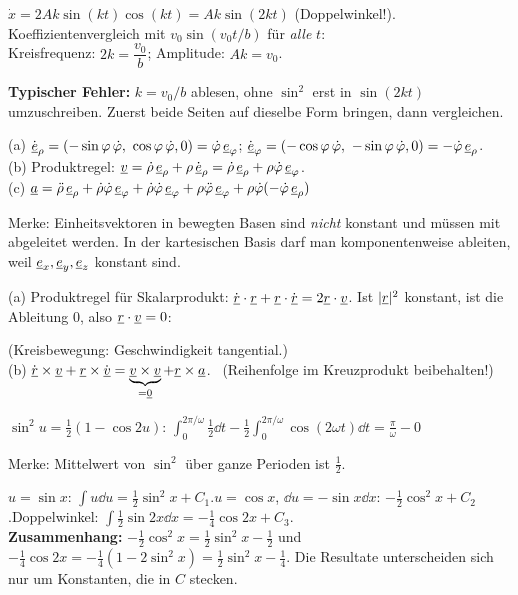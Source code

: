 \documentclass[11pt]{article}
\newcommand{\res}[1]{\par\smallskip\fbox{\ensuremath{\displaystyle #1}}\par\smallskip}
\begin{document}
 $\dot x=2Ak\sin(kt)\cos(kt)=Ak\sin(2kt)$ (Doppelwinkel!).\\
Koeffizientenvergleich mit $v_0\sin(v_0t/b)$ für \emph{alle} $t$:\\
Kreisfrequenz: $2k=\dfrac{v_0}{b}$; \quad Amplitude: $Ak=v_0$.
\res{k=\frac{v_0}{2b},\qquad A=2b}
\textbf{Typischer Fehler:} $k=v_0/b$ ablesen, ohne $\sin^2$ erst in $\sin(2kt)$ umzuschreiben. Zuerst beide Seiten auf dieselbe Form bringen, dann vergleichen.

 (a) $\dot{\vv e}_\rho=(-\sin\varphi\,\dot\varphi,\ \cos\varphi\,\dot\varphi,0)=\dot\varphi\,\e\varphi$;\quad
$\dot{\vv e}_\varphi=(-\cos\varphi\,\dot\varphi,\ -\sin\varphi\,\dot\varphi,0)=-\dot\varphi\,\e\rho$.\\
(b) Produktregel: $\underline{v}=\dot\rho\,\underline{e}_{\rho}+\rho\,\dot{\underline{e}}_\rho=\dot\rho\,\underline{e}_{\rho}+\rho\dot\varphi\,\underline{e}_{\varphi}$. \checkmark\\
(c) $\underline{a}=\ddot\rho\,\underline{e}_{\rho}+\dot\rho\dot\varphi\,\underline{e}_{\varphi}+\dot\rho\dot\varphi\,\underline{e}_{\varphi}+\rho\ddot\varphi\,\underline{e}_{\varphi}+\rho\dot\varphi(-\dot\varphi\,\underline{e}_{\rho})$
\res{\vv a=(\ddot\rho-\rho\dot\varphi^2)\,\e\rho+(2\dot\rho\dot\varphi+\rho\ddot\varphi)\,\e\varphi}
Merke: Einheitsvektoren in bewegten Basen sind \emph{nicht} konstant und müssen mit abgeleitet werden. In der kartesischen Basis darf man komponentenweise ableiten, weil $\underline{e}_{x},\underline{e}_{y},\underline{e}_{z}$ konstant sind.

 (a) Produktregel für Skalarprodukt: $\dot{\underline{r}}\cdot\underline{r}+\underline{r}\cdot\dot{\underline{r}}=2\underline{r}\cdot\underline{v}$. Ist $|\underline{r}|^2$ konstant, ist die Ableitung $0$, also $\underline{r}\cdot\underline{v}=0$: \res{\vv v\perp\vv r} (Kreisbewegung: Geschwindigkeit tangential.)\\
(b) $\dot{\underline{r}}\times\underline{v}+\underline{r}\times\dot{\underline{v}}=\underbrace{\underline{v}\times\underline{v}}_{=\underline{0}}+\underline{r}\times\underline{a}$. \checkmark\ (Reihenfolge im Kreuzprodukt beibehalten!)

 $\sin^2u=\frac12(1-\cos2u)$:
$\displaystyle\int_0^{2\pi/\omega}\tfrac12\dd t-\tfrac12\int_0^{2\pi/\omega}\cos(2\omega t)\dd t=\frac{\pi}{\omega}-0$ \res{\frac{\pi}{\omega}}
Merke: Mittelwert von $\sin^2$ über ganze Perioden ist $\tfrac12$.

 $u=\sin x$: $\int u\dd u=\tfrac12\sin^2x+C_1$.\quad $u=\cos x$, $\dd u=-\sin x\dd x$: $-\tfrac12\cos^2x+C_2$.\quad Doppelwinkel: $\int\tfrac12\sin2x\dd x=-\tfrac14\cos2x+C_3$.\\
\textbf{Zusammenhang:} $-\tfrac12\cos^2x=\tfrac12\sin^2x-\tfrac12$ und $-\tfrac14\cos2x=-\tfrac14(1-2\sin^2x)=\tfrac12\sin^2x-\tfrac14$. Die Resultate unterscheiden sich nur um Konstanten, die in $C$ stecken.
\end{document}
